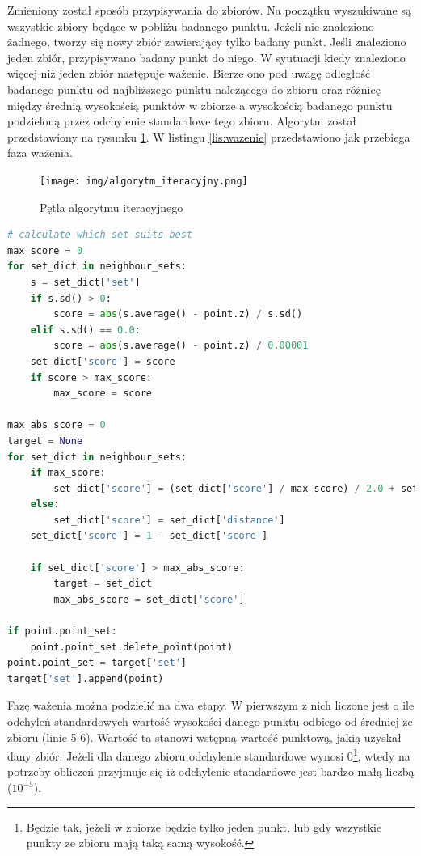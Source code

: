 Zmieniony został sposób przypisywania do zbiorów. Na początku wyszukiwane są wszystkie zbiory będące w pobliżu badanego punktu.
Jeżeli nie znaleziono żadnego, tworzy się nowy zbiór zawierający tylko badany punkt.
Jeśli znaleziono jeden zbiór, przypisywano badany punkt do niego.
W syutuacji kiedy znaleziono więcej niż jeden zbiór następuje ważenie. Bierze ono pod uwagę odległość badanego punktu od najbliższego
punktu należącego do zbioru oraz różnicę między średnią wysokością punktów w zbiorze a wysokością badanego punktu podzieloną
przez odchylenie standardowe tego zbioru. Algorytm został przedstawiony na rysunku \ref{fig:algorytm_iteracyjny}. W listingu
\ref{lis:wazenie} przedstawiono jak przebiega faza ważenia.

\begin{figure}[h!]
    \centering
    \texttt{[image: img/algorytm\_iteracyjny.png]}
    \caption{Pętla algorytmu iteracyjnego}
    \label{fig:algorytm_iteracyjny}
\end{figure}

\begin{lstlisting}[frame=L, language=python, label={lis:wazenie}, caption={Ważenie punktów w algorytmie iteracyjnym}]
# calculate which set suits best
max_score = 0
for set_dict in neighbour_sets:
    s = set_dict['set']
    if s.sd() > 0:
        score = abs(s.average() - point.z) / s.sd()
    elif s.sd() == 0.0:
        score = abs(s.average() - point.z) / 0.00001
    set_dict['score'] = score
    if score > max_score:
        max_score = score

max_abs_score = 0
target = None
for set_dict in neighbour_sets:
    if max_score:
        set_dict['score'] = (set_dict['score'] / max_score) / 2.0 + set_dict['distance']
    else:
        set_dict['score'] = set_dict['distance']
    set_dict['score'] = 1 - set_dict['score']

    if set_dict['score'] > max_abs_score:
        target = set_dict
        max_abs_score = set_dict['score']

if point.point_set:
    point.point_set.delete_point(point)
point.point_set = target['set']
target['set'].append(point)
\end{lstlisting}

Fazę ważenia można podzielić na dwa etapy. W pierwszym z nich liczone jest o ile odchyleń standardowych
wartość wysokości danego punktu odbiego od średniej ze zbioru (linie 5-6). Wartość ta stanowi wstępną wartość punktową, jakią uzyskał dany zbiór.
Jeżeli dla danego zbioru odchylenie standardowe wynosi 0\footnote{Będzie tak, jeżeli w zbiorze będzie tylko jeden punkt,
lub gdy wszystkie punkty ze zbioru mają taką samą wysokość.},
wtedy na potrzeby obliczeń przyjmuje się iż odchylenie standardowe jest bardzo małą liczbą ($10^{-5}$).

